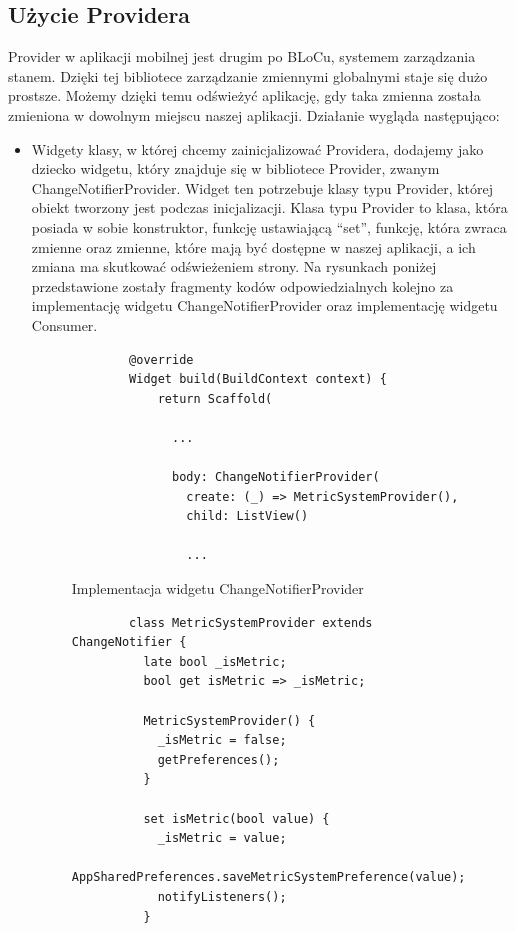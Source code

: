 \documentclass[a4paper,twoside,12pt]{book}
\begin{document}
\subsection{Użycie Providera}

Provider w aplikacji mobilnej jest drugim po BLoCu, systemem zarządzania stanem. Dzięki tej bibliotece zarządzanie zmiennymi globalnymi staje się dużo prostsze. Możemy dzięki temu odświeżyć aplikację, gdy taka zmienna została zmieniona w dowolnym miejscu naszej aplikacji. Działanie wygląda następująco:
\begin{itemize}
    \item Widgety klasy, w której chcemy zainicjalizować Providera, dodajemy jako dziecko widgetu, który znajduje się w bibliotece Provider, zwanym ChangeNotifierProvider. Widget ten potrzebuje klasy typu Provider, której obiekt tworzony jest podczas inicjalizacji. Klasa typu Provider to klasa, która posiada w sobie konstruktor, funkcję ustawiającą ``set'', funkcję, która zwraca zmienne oraz zmienne, które mają być dostępne w naszej aplikacji, a ich zmiana ma skutkować odświeżeniem strony. Na rysunkach poniżej przedstawione zostały fragmenty kodów odpowiedzialnych kolejno za implementację widgetu ChangeNotifierProvider oraz implementację widgetu Consumer.
    \begin{figure}[H]
        \begin{lstlisting}
        @override
        Widget build(BuildContext context) {
            return Scaffold(

              ...
              
              body: ChangeNotifierProvider(
                create: (_) => MetricSystemProvider(),
                child: ListView()

                ...
        \end{lstlisting}
    \caption{Implementacja widgetu ChangeNotifierProvider}
    \label{fig:pseudokod:listings}
    \end{figure}
    \begin{figure}[H]
        \begin{lstlisting}
        class MetricSystemProvider extends ChangeNotifier {
          late bool _isMetric;
          bool get isMetric => _isMetric;
        
          MetricSystemProvider() {
            _isMetric = false;
            getPreferences();
          }
        
          set isMetric(bool value) {
            _isMetric = value;
            AppSharedPreferences.saveMetricSystemPreference(value);
            notifyListeners();
          }
        

\end{lstlisting}
\end{figure}
\end{itemize}
\end{document}
